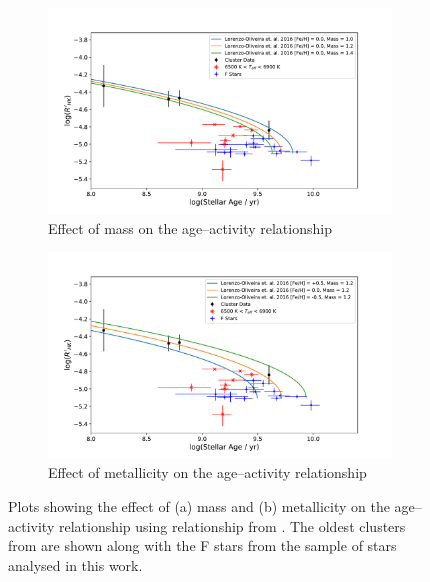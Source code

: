 \begin{figure}
    \centering
    \begin{subfigure}{\textwidth}
        \centering
        \includegraphics[scale=0.525]{Figures/4-Chromospheric_age/ca_results_LO_mass_w_hotstars.pdf}
        \caption{Effect of mass on the age--activity relationship}
    \end{subfigure}
    \begin{subfigure}{\textwidth}
        \centering
        \includegraphics[scale=0.525]{Figures/4-Chromospheric_age/ca_results_LO_metallicity_w_hotstars.pdf}
        \caption{Effect of metallicity on the age--activity relationship}
    \end{subfigure}
    \caption[Effect of mass and metallicity on the age--activity relationship]{Plots showing the effect of (a) mass and (b) metallicity on the age--activity relationship using relationship from \citet{Lorenzo_Oliveira_etal_2016}. The oldest clusters from \citet{Mamajek_Hillenbrand_2008} are shown along with the F stars from the sample of stars analysed in this work.}
    \label{fig:LO_plot}
\end{figure}

